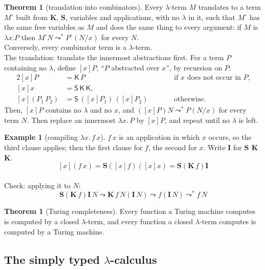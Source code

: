 \documentclass[a4paper, 11pt]{article}
\theoremstyle{definition}
\newtheorem{example}[definition]{Example}
\newtheorem{theorem}[definition]{Theorem}
\begin{document}
\begin{theorem}[translation into combinators]
    Every $\lambda$-term $M$ translates to a term $M^\circ$ built from \textbf{K}, \textbf{S}, variables and applications,
    with no $\lambda$ in it, such that $M^\circ$ has the same free variables as $M$ and does the same thing to every
    argument: if $M$ is $\lambda x. P$ then $M^\circ N \leadsto^* P^\circ (N/x)$ for every $N$. \\ Conversely,
    every combinator term is a $\lambda$-term. \\
    The translation: translate the innermost abstractions first. For a term $P$ containing no $\lambda$, define $[x]P$,
    ``$P$ abstracted over $x$'', by recursion on $P$:
    \begin{alignat*}{2}
        [x]P &= \mathsf{K}\,P && \qquad \text{if $x$ does not occur in $P$,} \\
        [x]x &= \mathsf{S}\,\mathsf{K}\,\mathsf{K}, && \\
        [x](P_1\,P_2) &= \mathsf{S}\,([x]P_1)\,([x]P_2) && \qquad \text{otherwise.}
    \end{alignat*}
    Then, $[x]P$ contains no $\lambda$ and no $x$, and $([x]P) N \leadsto^* P(N/x)$ for every term $N$. Then replace
    an innermost $\lambda x. \, P$ by $[x]P$, and repeat until no $\lambda$ is left. \\
\end{theorem}

\begin{example}[compiling $\lambda x. \, f \, x$]
    $f \, x$ is an application in which $x$ occurs, so the third clause applies; then the first clause for $f$, the
    second for $x$. Write \textbf{I} for \textbf{S K K}.
    \[[x](f \, x) = \textbf{S}([x]f)([x]x) = \textbf{S}(\textbf{K} \, f) \textbf{I}\] \\
    Check: applying it to $N$:
    \[\textbf{S}(\textbf{K} \, f)\textbf{I} \, N \leadsto \textbf{K} \, f \, N (\textbf{I} \, N) \leadsto f 
    (\textbf{I} \, N) \leadsto^* f \, N\]
\end{example}

\begin{theorem}[Turing completeness]
    Every function a Turing machine computes is computed by a closed $\lambda$-term, and every function a closed $\lambda$-term
    computes is computed by a Turing machine.
\end{theorem}

\subsection{The simply typed $\lambda$-calculus}
\end{document}
